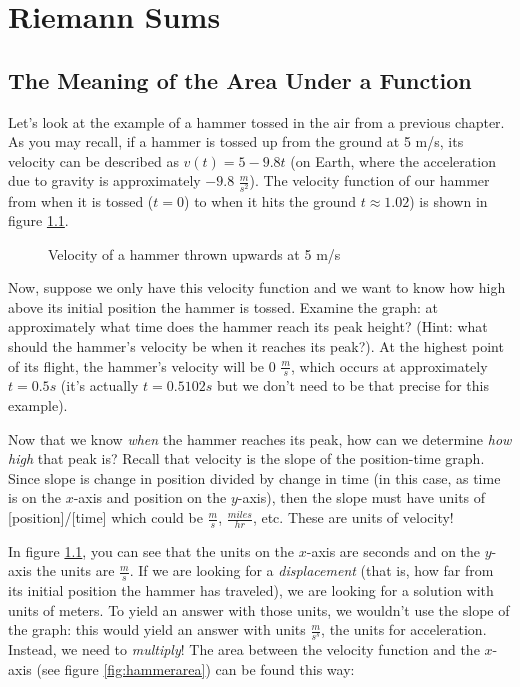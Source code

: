\chapter{Riemann Sums}

\section{The Meaning of the Area Under a Function}

Let's look at the example of a hammer tossed in the air from a previous chapter. As you may recall, if a hammer is tossed up from the ground at 5 m/s, its velocity can be described as $v(t) = 5-9.8t$ (on Earth, where the acceleration due to gravity is approximately $-9.8$ $\frac{m}{s^2}$). The velocity function of our hammer from when it is tossed ($t=0$) to when it hits the ground $t\approx1.02$) is shown in figure \ref{fig:hammer}.

\begin{figure}[htbp]
	\centering
	\caption{Velocity of a hammer thrown upwards at 5 m/s}
	\label{fig:hammer}
\end{figure}

Now, suppose we only have this velocity function and we want to know how high above its initial position the hammer is tossed. Examine the graph: at approximately what time does the hammer reach its peak height? (Hint: what should the hammer's velocity be when it reaches its peak?). At the highest point of its flight, the hammer's velocity will be $0$ $\frac{m}{s}$, which occurs at approximately $t=0.5s$ (it's actually $t=0.5102s$ but we don't need to be that precise for this example). 

Now that we know \textit{when} the hammer reaches its peak, how can we determine \textit{how high} that peak is? Recall that velocity is the slope of the position-time graph. Since slope is change in position divided by change in time (in this case, as time is on the $x$-axis and position on the $y$-axis), then the slope must have units of [position]/[time] which could be $\frac{m}{s}$, $\frac{miles}{hr}$, etc. These are units of velocity! 

In figure \ref{fig:hammer}, you can see that the units on the $x$-axis are seconds and on the $y$-axis the units are $\frac{m}{s}$. If we are looking for a \textit{displacement} (that is, how far from its initial position the hammer has traveled), we are looking for a solution with units of meters. To yield an answer with those units, we wouldn't use the slope of the graph: this would yield an answer with units $\frac{m}{s^s}$, the units for acceleration. Instead, we need to \textit{multiply}! The area between the velocity function and the $x$-axis (see figure \ref{fig:hammerarea}) can be found this way:

